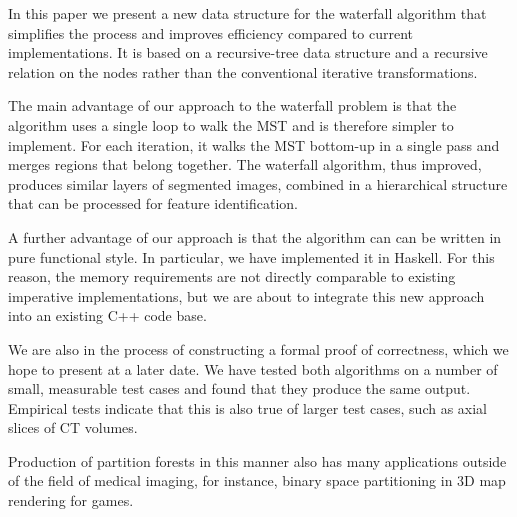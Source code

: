 \documentclass{ouclprgsc}
\begin{document}
In this paper we present a new data structure for the waterfall
algorithm that simplifies the process and improves efficiency compared
to current implementations. It is based on a recursive-tree data
structure and a recursive relation on the nodes rather than the
conventional iterative transformations.

The main advantage of our approach to the waterfall problem is that
the algorithm uses a single loop to walk the MST and is therefore
simpler to implement. For each iteration, it walks the MST bottom-up
in a single pass and merges regions that belong together. The
waterfall algorithm, thus improved, produces similar layers of
segmented images, combined in a hierarchical structure that can be
processed for feature identification.

A further advantage of our approach is that the algorithm can can be
written in pure functional style. In particular, we have implemented
it in Haskell. For this reason, the memory requirements are not
directly comparable to existing imperative implementations, but we are
about to integrate this new approach into an existing C++ code base.

We are also in the process of constructing a formal proof of
correctness, which we hope to present at a later date. We have tested
both algorithms on a number of small, measurable test cases and found
that they produce the same output. Empirical tests indicate that this
is also true of larger test cases, such as axial slices of CT volumes.

Production of partition forests in this manner also has many
applications outside of the field of medical imaging, for instance,
binary space partitioning in 3D map rendering for games.



\begin{thebibliography}{2}




\end{thebibliography}
\end{document}
